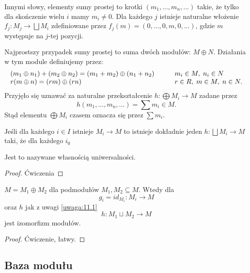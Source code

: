 Innymi słowy, elementy sumy prostej to krotki $(m_1,...,m_n,...)$ takie, że tylko dla skończenie wielu $i$ mamy $m_i\neq 0$. Dla każdego $j$ istnieje naturalne włożenie $f_j:M_j\to \bigsqcup M_i$ zdefiniowane przez $f_j(m)=(0,...,0,m,0,...)$, gdzie $m$ występuje na $j$-tej pozycji.

Najprostszy przypadek sumy prostej to suma dwóch modułów: $M\oplus N$. Działania w tym module definiujemy przez:
$$\begin{array}{l ll l}
  (m_1\oplus n_1)+(m_2\oplus n_2)=(m_1+m_2)\oplus(n_1+n_2) & & & m_i\in M,\;n_i\in N\\
  r(m\oplus n)=(rm)\oplus (rn) & & & r\in R,\; m\in M,\; n\in N.
\end{array}
$$
Przyjęło się uznawać za naturalne przekształcenie $h:\bigoplus M_i\to M$ zadane przez 
$$h(m_1,...,m_n,...)=\sum m_i\in M.$$ 
Stąd elementu $\bigoplus M_i$ czasem oznacza się przez $\sum m_i$.

\begin{remark}\label{uwaga:11.1}
Jeśli dla każdego $i\in I$ istnieje $M_i\to M$ to istnieje dokładnie jeden $h:\bigsqcup M_i\to M$ taki, że dla każdego $i_0$

\begin{center}\end{center}

Jest to nazywane własnością uniwersalności.
\end{remark}

\begin{proof}
  Ćwiczenia
\end{proof}

\begin{remark}
$M=M_1\oplus M_2$ dla podmodułów $M_1,M_2\subseteq M$. Wtedy dla 
$$g_i=id_{M_i}:M_i\to M$$ 
oraz $h$ jak z uwagi \ref{uwaga:11.1}
$$h:M_1\sqcup M_2\to M$$
jest izomorfizm modułów.
\end{remark}
\begin{proof}
Ćwiczenie, łatwy.
\end{proof}

\subsection{Baza modułu}

